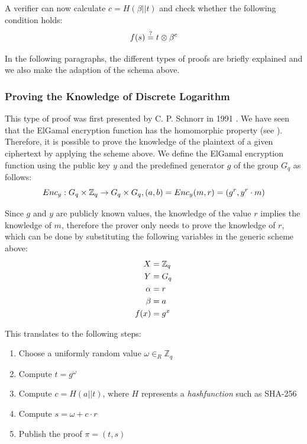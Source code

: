 \documentclass[numbers=noenddot, abstract=on, a4paper, headsepline,
footsepline, oneside, draft=off]{scrreprt}
\newcommand{\myref}[1]{(see \Vref{#1})}
\begin{document}
A verifier can now calculate $c=H(\beta||t)$ and check whether the following
condition holds:
\begin{equation}
	f(s) \stackrel{?}{=} t \otimes \beta^c \notag
\end{equation}

 In the following paragraphs, the different types of proofs are briefly
 explained and we also make the adaption of the schema above.
 
\subsubsection{Proving the Knowledge of Discrete Logarithm}
\label{sec:proofknowledgedlog}
This type of proof was first presented by C. P. Schnorr in 1991
\cite{Schnorr91}. We have seen that the ElGamal encryption function has the
homomorphic property \myref{sec:homenc}. Therefore, it is possible to prove the
knowledge of the plaintext of a given ciphertext by applying the scheme above.
We define the ElGamal encryption function using the public key $y$ and the
predefined generator $g$ of the group $G_q$ as follows:
\begin{equation}
	Enc_y:G_q \times \mathbb{Z}_q \rightarrow G_q \times G_q, (a,b) = Enc_y(m,
	r)=(g^r, y^r \cdot m) \notag
\end{equation} 

Since $g$ and $y$ are publicly known values, the knowledge of the value $r$
implies the knowledge of $m$, therefore the prover only needs to prove the
knowledge of $r$, which can be done by substituting the following variables in
the generic scheme above:
\begin{align}
  X &= \mathbb{Z}_q \notag \\
  Y &= G_q \notag \\
  \alpha &=r \notag \\
  \beta &=a \notag \\
  f(x) &= g^x \notag
\end{align} 


This translates to the following steps:

\begin{enumerate}
  \item Choose a uniformly random value $\omega \in_R \mathbb{Z}_q$
  \item Compute $t=g^\omega$
  \item Compute $c=H(a||t)$, where $H$ represents a \emph{hashfunction} such
  as SHA-256
  \item Compute $s=\omega + c \cdot r$
  \item Publish the proof $\pi = (t,s)$
\end{enumerate}
\end{document}
